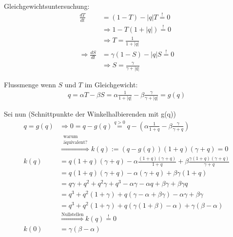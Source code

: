 \documentclass[11pt,a4paper]{article}
\begin{document}
	\newpage	
	
	Gleichgewichtsuntersuchung:
	\begin{align*}
		\frac{dT}{dt} &= \left(1 - T\right) - \left|q\right|T \stackrel{!}{=} 0 \\
		&\Rightarrow 1 - T\left(1 + |q|\right) \stackrel{!}{=} 0 \\
		&\Rightarrow T = \frac{1}{1+|q|} \\
		\Rightarrow \frac{dS}{dt} &= \gamma \left(1 - S\right) - \left|q\right|S \stackrel{!}{=} 0 \\
		&\Rightarrow S = \frac{\gamma}{\gamma + |q|}
	\end{align*}
	
	Flussmenge wenn \(S\) und \(T\) im Gleichgewicht:
	\begin{align*}
		q = \alpha T - \beta S
		 = \alpha \frac{1}{1+|q|} - \beta \frac{\gamma}{\gamma + |q|} = g(q)
	\end{align*}
	
	Sei nun (Schnittpunkte der Winkelhalbierenden mit g(q))
	\begin{align*}
		q = g(q) &\Rightarrow 0 = q - g(q) \stackrel{q > 0}{=}  q - \left(\alpha \frac{1}{1+q} - \beta \frac{\gamma}{\gamma + q} \right) \\
		& \stackrel{\substack{\textrm{warum}\\\textrm{äquivalent?}}}{\Rightarrow}
		k(q) := \left( q - g(q) \right) (1+q) (\gamma + q) = 0 \\
		k(q) &= q(1+q) (\gamma + q) - \alpha \frac{(1+q) (\gamma + q)}{1+q} + \beta \frac{\gamma (1+q) (\gamma + q)}{\gamma + q} \\
		&= q(1+q) (\gamma + q) - \alpha (\gamma + q) + \beta \gamma (1+q) \\
		&= q \gamma + q^2 + q^2 \gamma + q^3 - \alpha \gamma - \alpha q + \beta \gamma + \beta \gamma q \\
		&= q^3 + q^2(1 + \gamma) + q(\gamma - \alpha + \beta \gamma) - \alpha \gamma + \beta \gamma \\
		&= q^3 + q^2(1 + \gamma) + q\left(\gamma \left(1 + \beta\right) - \alpha \right) + \gamma \left( \beta - \alpha \right) \\
		& \stackrel{\textrm{Nullstellen}}{\Rightarrow} k(q) \stackrel{!}{=} 0 \\
		k(0) &= \gamma \left( \beta - \alpha \right)
	\end{align*}
	
\end{document}
